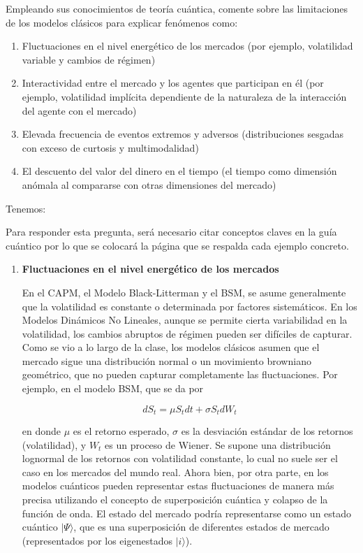 \begin{problema}
    Empleando sus conocimientos de teoría cuántica, comente sobre las limitaciones de los modelos clásicos para explicar fenómenos como:
\begin{enumerate}
    \item Fluctuaciones en el nivel energético de los mercados (por ejemplo, volatilidad variable y
    cambios de régimen)
    \item Interactividad entre el mercado y los agentes que participan en él (por ejemplo, volatilidad
    implícita dependiente de la naturaleza de la interacción del agente con el mercado)
    \item Elevada frecuencia de eventos extremos y adversos (distribuciones sesgadas con exceso de
    curtosis y multimodalidad)
    \item El descuento del valor del dinero en el tiempo (el tiempo como dimensión anómala al
    compararse con otras dimensiones del mercado)
\end{enumerate}
\begin{sol}
    Tenemos: 
    \begin{cajita}
        Para responder esta pregunta, será necesario citar conceptos claves en la guía cuántico por lo que se colocará la página que se respalda cada ejemplo concreto.
    \end{cajita}
    
    \begin{enumerate}
    \item \textbf{Fluctuaciones en el nivel energético de los mercados}
    
    En el CAPM, el Modelo Black-Litterman y el BSM, se asume generalmente que la volatilidad es constante o determinada por factores sistemáticos. En los Modelos Dinámicos No Lineales, aunque se permite cierta variabilidad en la volatilidad, los cambios abruptos de régimen pueden ser difíciles de capturar. Como se vio a lo largo de la clase, los modelos clásicos asumen que el mercado sigue una distribución normal o un movimiento browniano geométrico, que no pueden capturar completamente las fluctuaciones. Por ejemplo, en el modelo BSM, que se da por

\begin{equation*}
dS_t = \mu S_t dt + \sigma S_t dW_t
\end{equation*}

en donde $\mu$ es el retorno esperado, $\sigma$ es la desviación estándar de los retornos (volatilidad), y $W_t$ es un proceso de Wiener. Se supone una distribución lognormal de los retornos con volatilidad constante, lo cual no suele ser el caso en los mercados del mundo real. Ahora bien, por otra parte, en los modelos cuánticos pueden representar estas fluctuaciones de manera más precisa utilizando el concepto de superposición cuántica y colapso de la función de onda. El estado del mercado podría representarse como un estado cuántico $|\Psi\rangle$, que es una superposición de diferentes estados de mercado (representados por los eigenestados $|i\rangle$).


\end{enumerate}
\end{sol}
\end{problema}
